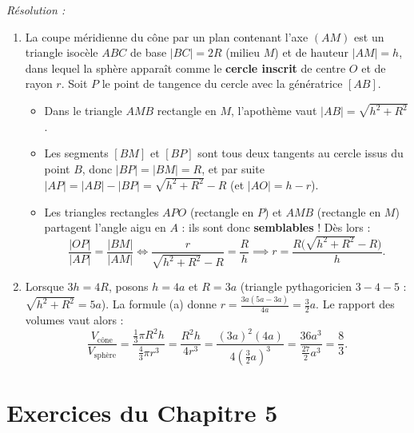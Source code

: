 \begin{exemple}
\begin{center}
\end{center}
\emph{Résolution :}
\begin{enumerate}[label=(\alph*)]
    \item La coupe méridienne du cône par un plan contenant l'axe $(AM)$ est un triangle isocèle $ABC$ de base $|BC| = 2R$ (milieu $M$) et de hauteur $|AM| = h$, dans lequel la sphère apparaît comme le \textbf{cercle inscrit} de centre $O$ et de rayon $r$. Soit $P$ le point de tangence du cercle avec la génératrice $[AB]$.
    \begin{itemize}
        \item Dans le triangle $AMB$ rectangle en $M$, l'apothème vaut $|AB| = \sqrt{h^2 + R^2}$.
        \item Les segments $[BM]$ et $[BP]$ sont tous deux tangents au cercle issus du point $B$, donc $|BP| = |BM| = R$, et par suite $|AP| = |AB| - |BP| = \sqrt{h^2+R^2} - R$ (et $|AO| = h - r$).
        \item Les triangles rectangles $APO$ (rectangle en $P$) et $AMB$ (rectangle en $M$) partagent l'angle aigu en $A$ : ils sont donc \textbf{semblables} ! Dès lors :
        \[
            \frac{|OP|}{|AP|} = \frac{|BM|}{|AM|} \iff \frac{r}{\sqrt{h^2+R^2}-R} = \frac{R}{h} \implies r = \boxed{\frac{R\bigl(\sqrt{h^2+R^2}-R\bigr)}{h}}.
        \]
    \end{itemize}
    \item Lorsque $3h = 4R$, posons $h = 4a$ et $R = 3a$ (triangle pythagoricien $3-4-5$ : $\sqrt{h^2+R^2} = 5a$). La formule (a) donne $r = \frac{3a(5a-3a)}{4a} = \frac{3}{2}a$. Le rapport des volumes vaut alors :
    \[
        \frac{V_{\text{cône}}}{V_{\text{sphère}}} = \frac{\frac{1}{3}\pi R^2 h}{\frac{4}{3}\pi r^3} = \frac{R^2 h}{4r^3} = \frac{(3a)^2(4a)}{4\left(\frac{3}{2}a\right)^3} = \frac{36a^3}{\frac{27}{2}a^3} = \boxed{\frac{8}{3}}.
    \]
\end{enumerate}
\end{exemple}

\section{Exercices du Chapitre 5}

